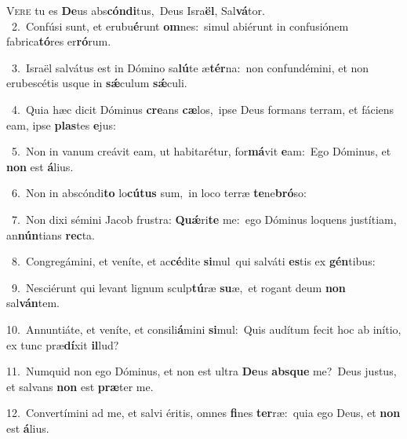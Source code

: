 \lettrine{\initial\textcolor{\initialcolor}{V}}{ere} tu es \textbf{De}\-us abs\-\textbf{cón}\-\textbf{di}tus,~\star Deus Isra\-\textbf{ël}\-, Sal\-\textbf{vá}\-tor.\\
{\numbfont\textcolor{\numbcolor}{~2.}}~Confúsi sunt, et erubu\-\textbf{é}\-runt \textbf{om}\-nes:~\star simul abiérunt in confusiónem fabrica\-\textbf{tó}\-res er\-\textbf{ró}\-rum.\par
{\numbfont\textcolor{\numbcolor}{~3.}}~Israël salvátus est in Dómino sa\-\textbf{lú}\-te æ\-\textbf{tér}\-na:~\star non confundémini, et non erubescétis usque in \textbf{sǽ}\-culum \textbf{sǽ}\-culi.\par
{\numbfont\textcolor{\numbcolor}{~4.}}~Quia hæc dicit Dóminus \textbf{cre}\-ans \textbf{cæ}\-los,~\star ipse Deus formans terram, et fáciens eam, ipse \textbf{plas}\-tes \textbf{e}\-jus:\par
{\numbfont\textcolor{\numbcolor}{~5.}}~Non in vanum creávit eam, ut habitarétur, for\-\textbf{má}\-vit \textbf{e}\-am:~\star Ego Dóminus, et \textbf{non} est \textbf{á}\-lius.\par
{\numbfont\textcolor{\numbcolor}{~6.}}~Non in abscóndi\textbf{to} lo\-\textbf{cú}\-\textbf{tus} sum,~\star in loco terræ \textbf{te}\-ne\-\textbf{bró}\-so:\par
{\numbfont\textcolor{\numbcolor}{~7.}}~Non dixi sémini Jacob frustra: \textbf{Quǽ}\-ri\textbf{te} me:~\star ego Dóminus loquens justítiam, an\-\textbf{nún}\-tians \textbf{rec}\-ta.\par
{\numbfont\textcolor{\numbcolor}{~8.}}~Congregámini, et veníte, et ac\-\textbf{cé}\-dite \textbf{si}\-mul~\star qui salváti \textbf{es}\-tis ex \textbf{gén}\-tibus:\par
{\numbfont\textcolor{\numbcolor}{~9.}}~Nesciérunt qui levant lignum sculp\-\textbf{tú}\-ræ \textbf{su}\-æ,~\star et rogant deum \textbf{non} sal\-\textbf{ván}\-tem.\par
{\numbfont\textcolor{\numbcolor}{10.}}~Annuntiáte, et veníte, et consili\-\textbf{á}\-mini \textbf{si}\-mul:~\star Quis audítum fecit hoc ab inítio, ex tunc præ\-\textbf{dí}\-xit \textbf{il}\-lud?\par
{\numbfont\textcolor{\numbcolor}{11.}}~Numquid non ego Dóminus, et non est ultra \textbf{De}\-us \textbf{abs}\-\textbf{que} me?~\star Deus justus, et salvans \textbf{non} est \textbf{præ}\-ter me.\par
{\numbfont\textcolor{\numbcolor}{12.}}~Convertímini ad me, et salvi éritis, omnes \textbf{fi}\-nes \textbf{ter}\-ræ:~\star quia ego Deus, et \textbf{non} est \textbf{á}\-lius.\par
